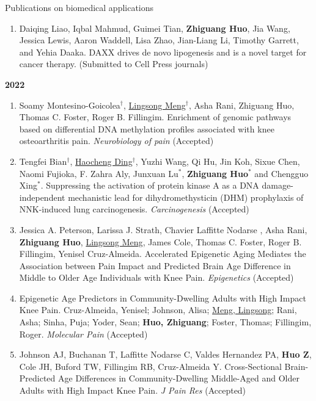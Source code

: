 \documentclass{resume} %
\begin{document}
\begin{rSection}{Publications on biomedical applications}
\begin{enumerate}[noitemsep,topsep=0pt]
\item  Daiqing Liao, Iqbal Mahmud, Guimei Tian, {\bf Zhiguang Huo}, Jia Wang, Jessica Lewis, Aaron Waddell, Lisa Zhao, Jian-Liang Li, Timothy Garrett, and Yehia Daaka. 
DAXX drives de novo lipogenesis and is a novel target for cancer therapy. 
(Submitted to Cell Press journals)

\end{enumerate}

\textbf{2022}
\begin{enumerate}[noitemsep,topsep=0pt, resume]



\item Soamy Montesino-Goicolea$^\dagger$, \underline{Lingsong Meng}$^\dagger$, Asha Rani, Zhiguang Huo, Thomas C. Foster, Roger B. Fillingim.
Enrichment of genomic pathways based on differential DNA methylation profiles associated with knee osteoarthritis pain.
\emph{Neurobiology of pain} (Accepted)


\item
Tengfei Bian$^\dagger$, \underline{Haocheng Ding}$^\dagger$, Yuzhi Wang, Qi Hu, Jin Koh, Sixue Chen, Naomi Fujioka, F. Zahra Aly, Junxuan Lu$^*$, {\bf Zhiguang Huo}$^*$ and Chengguo Xing$^*$.
Suppressing the activation of protein kinase A as a DNA damage-independent mechanistic lead for dihydromethysticin (DHM) prophylaxis of NNK-induced lung carcinogenesis.
\emph{Carcinogenesis} (Accepted)

\item
Jessica A. Peterson, Larissa J. Strath, Chavier Laffitte Nodarse , Asha Rani, {\bf Zhiguang Huo}, \underline{Lingsong Meng}, James Cole, Thomas C. Foster, Roger B. Fillingim, Yenisel Cruz-Almeida. 
Accelerated Epigenetic Aging Mediates the Association between Pain Impact and Predicted Brain Age Difference in Middle to Older Age Individuals with Knee Pain.  
\emph{Epigenetics} (Accepted)

\item Epigenetic Age Predictors in Community-Dwelling Adults with High Impact Knee Pain.
Cruz-Almeida, Yenisel; Johnson, Alisa; \underline{Meng, Lingsong}; Rani, Asha; Sinha, Puja; Yoder, Sean; {\bf Huo, Zhiguang}; Foster, Thomas; Fillingim, Roger.
\emph{Molecular Pain} (Accepted)

\item  
Johnson AJ, Buchanan T, Laffitte Nodarse C, Valdes Hernandez PA, {\bf Huo Z}, Cole JH, Buford TW, Fillingim RB, Cruz-Almeida Y.
Cross-Sectional Brain-Predicted Age Differences in Community-Dwelling Middle-Aged and Older Adults with High Impact Knee Pain. 
\emph{J Pain Res} (Accepted)



\end{enumerate}
\end{rSection}
\end{document}
